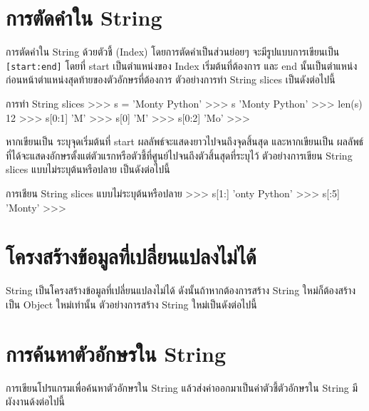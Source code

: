 \section{การตัดคำใน String}

การตัดคำใน String ด้วยตัวชี้ (Index) โดยการตัดคำเป็นส่วนย่อยๆ จะมีรูปแบบการเขียนเป็น \texttt{[start:end]} โดยที่ start เป็นตำแหน่งของ Index เริ่มต้นที่ต้องการ และ end นั้นเป็นตำแหน่งก่อนหน้าตำแหน่งสุดท้ายของตัวอักษรที่ต้องการ ตัวอย่างการทำ String slices เป็นดังต่อไปนี้

\begin{codelist}{การทำ String slices}{}
>>> s = 'Monty Python'
>>> s
'Monty Python'
>>> len(s)
12
>>> s[0:1]
'M'
>>> s[0]
'M'
>>> s[0:2]
'Mo'
>>>
\end{codelist}


หากเขียนเป็น  \pyinline{[start:]} ระบุจุดเริ่มต้นที่ start ผลลัพธ์จะแสดงยาวไปจนถึงจุดสิ้นสุด และหากเขียนเป็น  \pyinline{[:end]} ผลลัพธ์ที่ได้จะแสดงอักษรตั้งแต่ตัวแรกหรือตัวชี้ที่ศูนย์ไปจนถึงตัวสิ้นสุดที่ระบุไว้ ตัวอย่างการเขียน String slices แบบไม่ระบุต้นหรือปลาย เป็นดังต่อไปนี้

\begin{codelist}{การเชียน String slices แบบไม่ระบุต้นหรือปลาย}{}
>>> s[1:]
'onty Python'
>>> s[:5]
'Monty'
>>>
\end{codelist}


\section{โครงสร้างข้อมูลที่เปลี่ยนแปลงไม่ได้}

String เป็นโครงสร้างข้อมูลที่เปลี่ยนแปลงไม่ได้ ดังนั้นถ้าหากต้องการสร้าง String ใหม่ก็ต้องสร้างเป็น Object ใหม่เท่านั้น ตัวอย่างการสร้าง String ใหม่เป็นดังต่อไปนี้



\section{การค้นหาตัวอักษรใน String}

การเขียนโปรแกรมเพื่อค้นหาตัวอักษรใน String แล้วส่งค่าออกมาเป็นค่าตัวชี้ตัวอักษรใน String มีผังงานด้งต่อไปนี้

